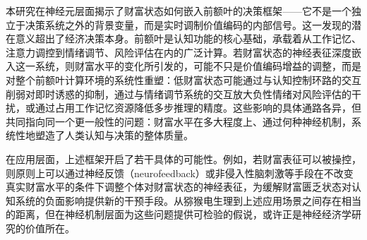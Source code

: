本研究在神经元层面揭示了财富状态如何嵌入前额叶的决策框架——它不是一个独立于决策系统之外的背景变量，而是实时调制价值编码的内部信号。这一发现的潜在意义超出了经济决策本身。前额叶是认知功能的核心基础，承载着从工作记忆、注意力调控到情绪调节、风险评估在内的广泛计算。若财富状态的神经表征深度嵌入这一系统，则财富水平的变化所引发的，可能不只是价值编码增益的调整，而是对整个前额叶计算环境的系统性重塑：低财富状态可能通过与认知控制环路的交互削弱对即时诱惑的抑制，通过与情绪调节系统的交互放大负性情绪对风险评估的干扰，或通过占用工作记忆资源降低多步推理的精度。这些影响的具体通路各异，但共同指向同一个更一般性的问题：财富水平在多大程度上、通过何种神经机制，系统性地塑造了人类认知与决策的整体质量。

在应用层面，上述框架开启了若干具体的可能性。例如，若财富表征可以被操控，则原则上可以通过神经反馈（neurofeedback）或非侵入性脑刺激等手段在不改变真实财富水平的条件下调整个体对财富状态的神经表征，为缓解财富匮乏状态对认知系统的负面影响提供新的干预手段。从猕猴电生理到上述应用场景之间存在相当的距离，但在神经机制层面为这些问题提供可检验的假说，或许正是神经经济学研究的价值所在。